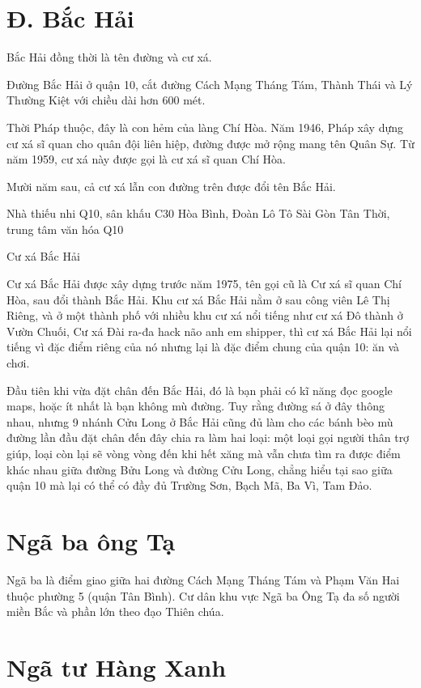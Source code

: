 \section{Đ. Bắc Hải}

Bắc Hải đồng thời là tên đường và cư xá.

 Đường Bắc Hải ở quận 10, cắt đường Cách Mạng Tháng Tám, Thành Thái và Lý Thường Kiệt với chiều dài hơn 600 mét.

Thời Pháp thuộc, đây là con hẻm của làng Chí Hòa. Năm 1946, Pháp xây dựng cư xá sĩ quan cho quân đội liên hiệp, đường được mở rộng mang tên Quân Sự. Từ năm 1959, cư xá này được gọi là cư xá sĩ quan Chí Hòa.

Mười năm sau, cả cư xá lẫn con đường trên được đổi tên Bắc Hải.

Nhà thiếu nhi Q10, sân khấu C30 Hòa Bình, Đoàn Lô Tô Sài Gòn Tân Thời, trung tâm văn hóa Q10

Cư xá Bắc Hải

Cư xá Bắc Hải được xây dựng trước năm 1975, tên gọi cũ là Cư xá sĩ quan Chí Hòa, sau đổi thành Bắc Hải. Khu cư xá Bắc Hải nằm ở sau công viên Lê Thị Riêng, và ở một thành phố với nhiều khu cư xá nổi tiếng như cư xá Đô thành ở Vườn Chuối, Cư xá Đài ra-đa hack não anh em shipper, thì cư xá Bắc Hải lại nổi tiếng vì đặc điểm riêng của nó nhưng lại là đặc điểm chung của quận 10: ăn và chơi.

Đầu tiên khi vừa đặt chân đến Bắc Hải, đó là bạn phải có kĩ năng đọc google maps, hoặc ít nhất là bạn không mù đường. Tuy rằng đường sá ở đây thông nhau, nhưng 9 nhánh Cửu Long ở Bắc Hải cũng đủ làm cho các bánh bèo mù đường lần đầu đặt chân đến đây chia ra làm hai loại: một loại gọi người thân trợ giúp, loại còn lại sẽ vòng vòng đến khi hết xăng mà vẫn chưa tìm ra được điểm khác nhau giữa đường Bửu Long và đường Cửu Long, chẳng hiểu tại sao giữa quận 10 mà lại có thể có đầy đủ Trường Sơn, Bạch Mã, Ba Vì, Tam Đảo.

\section{Ngã ba ông Tạ}

Ngã ba là điểm giao giữa hai đường Cách Mạng Tháng Tám và Phạm Văn Hai thuộc phường 5 (quận Tân Bình). Cư dân khu vực Ngã ba Ông Tạ đa số người miền Bắc và phần lớn theo đạo Thiên chúa.

\section{Ngã tư Hàng Xanh}

